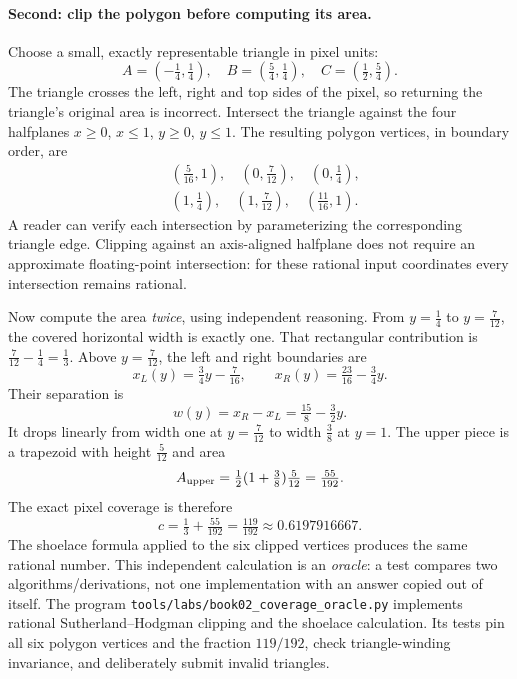 \paragraph{Second: clip the polygon before computing its area.}
Choose a small, exactly representable triangle in pixel units:
\[
A=(-\tfrac14,\tfrac14),\quad
B=(\tfrac54,\tfrac14),\quad
C=(\tfrac12,\tfrac54).
\]
The triangle crosses the left, right and top sides of the pixel,
so returning the triangle's original area is incorrect.
Intersect the triangle against the four halfplanes
\(x\ge0\), \(x\le1\), \(y\ge0\), \(y\le1\).
The resulting polygon vertices, in boundary order, are
\[
\begin{aligned}
&(\tfrac5{16},1),\quad (0,\tfrac7{12}),\quad
(0,\tfrac14),\\
&(1,\tfrac14),\quad (1,\tfrac7{12}),\quad
(\tfrac{11}{16},1).
\end{aligned}
\]
A reader can verify each intersection by parameterizing the
corresponding triangle edge. Clipping against an axis-aligned
halfplane does not require an approximate floating-point
intersection: for these rational input coordinates every
intersection remains rational.

Now compute the area \emph{twice}, using independent reasoning.
From \(y=\tfrac14\) to \(y=\tfrac7{12}\), the covered horizontal
width is exactly one. That rectangular contribution is
\(\tfrac7{12}-\tfrac14=\tfrac13\).
Above \(y=\tfrac7{12}\), the left and right boundaries are
\[
x_L(y)=\tfrac34y-\tfrac7{16},\qquad
x_R(y)=\tfrac{23}{16}-\tfrac34y.
\]
Their separation is
\[
w(y)=x_R-x_L=\tfrac{15}{8}-\tfrac32y.
\]
It drops linearly from width one at \(y=\tfrac7{12}\) to
width \(\tfrac38\) at \(y=1\). The upper piece is a trapezoid
with height \(\tfrac5{12}\) and area
\[
A_{\rm upper}
=\tfrac12(1+\tfrac38)\tfrac5{12}
=\tfrac{55}{192}.
\]
The exact pixel coverage is therefore
\[
\boxed{c=\tfrac13+\tfrac{55}{192}
=\tfrac{119}{192}\approx0.6197916667.}
\]
The shoelace formula applied to the six clipped vertices
produces the same rational number. This independent calculation
is an \emph{oracle}: a test compares two algorithms/derivations,
not one implementation with an answer copied out of itself.
The program \nolinkurl{tools/labs/book02_coverage_oracle.py}
implements rational Sutherland--Hodgman clipping and the
shoelace calculation. Its tests pin all six polygon vertices
and the fraction \(119/192\), check triangle-winding
invariance, and deliberately submit invalid triangles.

